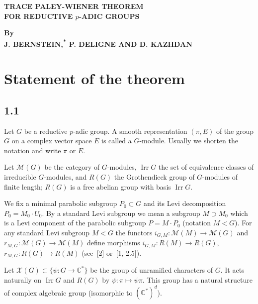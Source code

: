 \documentclass[12pt,a4paper]{article}
\theoremstyle{plain}
\theoremstyle{definition}
\theoremstyle{remark}
\DeclareMathOperator{\Irr}{Irr}
\newcommand{\cM}{\mathscr{M}}
\newcommand{\cX}{\mathcal{X}}
\newcommand{\bC}{\mathbb{C}}
\begin{document}
\begin{center}
{\large\bfseries TRACE PALEY-WIENER THEOREM\\[2mm] FOR REDUCTIVE $p$-ADIC GROUPS}
\end{center}

\vspace{3mm}

\begin{center}
\textbf{By}\\[2mm]
\textbf{J. BERNSTEIN,\textsuperscript{*} P. DELIGNE AND D. KAZHDAN\textsuperscript{\textdagger}}
\end{center}

\vspace{5mm}

\section*{Statement of the theorem}

\subsection*{1.1}

Let $G$ be a reductive $p$-adic group. A smooth representation $(\pi, E)$ of the group $G$ on a complex vector space $E$ is called a $G$-module. Usually we shorten the notation and write $\pi$ or $E$.

Let $\cM(G)$ be the category of $G$-modules, $\Irr G$ the set of equivalence classes of irreducible $G$-modules, and $R(G)$ the Grothendieck group of $G$-modules of finite length; $R(G)$ is a free abelian group with basis $\Irr G$.

We fix a minimal parabolic subgroup $P_0 \subset G$ and its Levi decomposition $P_0 = M_0 \cdot U_0$. By a standard Levi subgroup we mean a subgroup $M \supset M_0$ which is a Levi component of the parabolic subgroup $P = M \cdot P_0$ (notation $M < G$). For any standard Levi subgroup $M < G$ the functors $i_{G,M}: \cM(M) \to \cM(G)$ and $r_{M,G}: \cM(G) \to \cM(M)$ define morphisms $i_{G,M}: R(M) \to R(G)$, $r_{M,G}: R(G) \to R(M)$ (see~[2] or~[1, 2.5]).

Let $\cX(G) \subset \{\psi: G \to \bC^*\}$ be the group of unramified characters of $G$. It acts naturally on $\Irr G$ and $R(G)$ by $\psi: \pi \mapsto \psi\pi$. This group has a natural structure of complex algebraic group (isomorphic to $(\bC^*)^d$).
\end{document}
